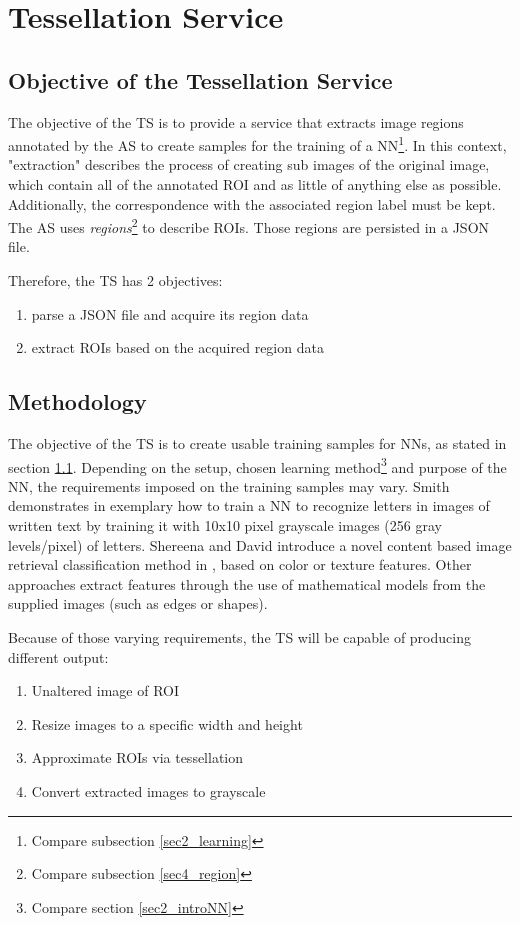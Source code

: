\chapter{Tessellation Service}

\section{Objective of the Tessellation Service}
\label{sec5_objective}
The objective of the TS is to provide a service that extracts image regions annotated by the AS to create samples for the training of a NN\footnote{
	Compare subsection \ref{sec2_learning}
}. In this context, "extraction" describes the process of creating sub images of the original image, which contain all of the annotated ROI and as little of anything else as possible. Additionally, the correspondence with the associated region label must be kept. The AS uses \emph{regions}\footnote{
	Compare subsection \ref{sec4_region}
} to describe ROIs. Those regions are persisted in a JSON file.

Therefore, the TS has 2 objectives:
\begin{enumerate}[(1)]
	\item parse a JSON file and acquire its region data
	\item extract ROIs based on the acquired region data
\end{enumerate}


\section{Methodology}
\label{sec5_method}
The objective of the TS is to create usable training samples for NNs, as stated in section \ref{sec5_objective}. Depending on the setup, chosen learning method\footnote{
	Compare section \ref{sec2_introNN}
} and purpose of the NN, the requirements imposed on the training samples may vary. Smith demonstrates in \cite{Smith97} exemplary how to train a NN to recognize letters in images of written text by training it with 10x10 pixel grayscale images (256 gray levels/pixel) of letters. Shereena and David introduce a novel content based image retrieval classification method in \cite{Shereena14}, based on color or texture features. Other approaches extract features through the use of mathematical models from the supplied images (such as edges or shapes)\cite{Harvey91}.

Because of those varying requirements, the TS will be capable of producing different output:
\begin{enumerate}[(1)]
	\item Unaltered image of ROI
	\item Resize images to a specific width and height
	\item Approximate ROIs via tessellation
	\item Convert extracted images to grayscale
\end{enumerate}

